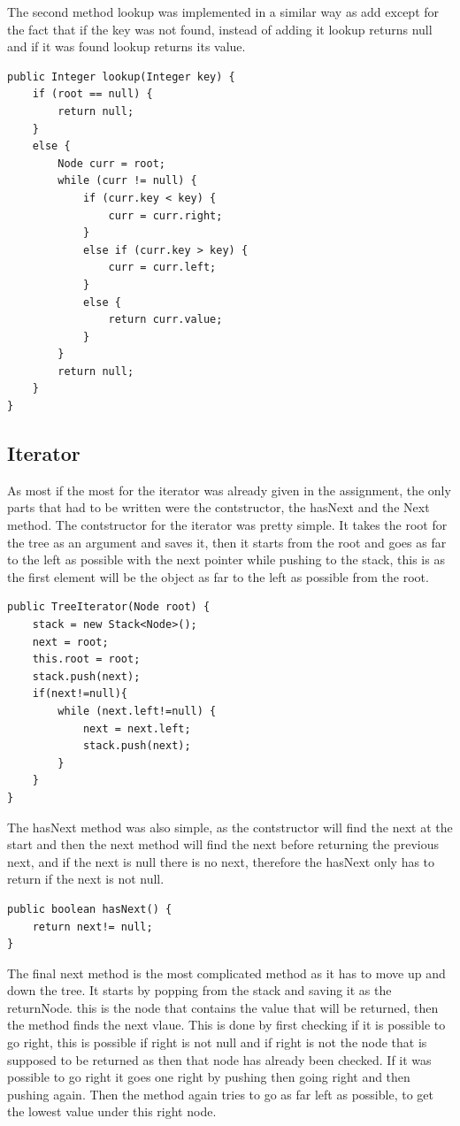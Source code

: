 \documentclass[a4paper,11pt]{article}
\begin{document}
The second method lookup was implemented in a similar way as add except for the fact that if the key was not found, instead of adding it lookup returns null and if it was found lookup returns its value.
\begin{verbatim}
public Integer lookup(Integer key) {
    if (root == null) {
        return null;
    }     
    else {
        Node curr = root;
        while (curr != null) {
            if (curr.key < key) {
                curr = curr.right;
            }             
            else if (curr.key > key) {
                curr = curr.left;
            }             
            else {
                return curr.value;
            }
        }
        return null;
    }  
}
\end{verbatim}
\subsection*{Iterator}
As most if the most for the iterator was already given in the assignment, the only parts that had to be written were the contstructor, the hasNext and the Next method.
The contstructor for the iterator was pretty simple. It takes the root for the tree as an argument and saves it, then it starts from the root and goes as far to the left as possible with the next pointer while pushing to the stack, this is as the first element will be the object as far to the left as possible from the root.
\begin{verbatim}
public TreeIterator(Node root) {
    stack = new Stack<Node>();
    next = root;
    this.root = root;
    stack.push(next);
    if(next!=null){
        while (next.left!=null) {
            next = next.left;
            stack.push(next);
        }
    }
}
\end{verbatim}
The hasNext method was also simple, as the contstructor will find the next at the start and then the next method will find the next before returning the previous next, and if the next is null 
there is no next, therefore the hasNext only has to return if the next is not null.
\begin{verbatim}
public boolean hasNext() {
    return next!= null;
}
\end{verbatim}
The final next method is the most complicated method as it has to move up and down the tree. It starts by popping from the stack and saving it as the returnNode. this is the node that contains the value that will be returned, then the method finds the next vlaue. 
This is done by first checking if it is possible to go right, this is possible if right is not null and if right is not the node that is supposed to be returned as then that node has already been checked. If it was possible to go right it goes one right by pushing then going right and then pushing again. Then the method again tries to go as far left as possible, to get the lowest value under this right node. 
\end{document}
